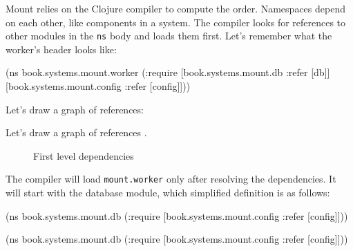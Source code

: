 Mount relies on the Clojure compiler to compute the order. Namespaces depend on each other, like components in a system. The compiler looks for references to other modules in the \verb|ns| body and loads them first. Let's remember what the worker's header looks like:

\begin{english}
  \begin{clojure}
(ns book.systems.mount.worker
  (:require
   [book.systems.mount.db :refer [db]]
   [book.systems.mount.config
     :refer [config]]))
  \end{clojure}
\end{english}


\ifx\MODE\PRINT

\noindent
Let's draw a graph of references:

\begin{figure}[h!]
\end{figure}

\fi

\ifx\MODE\EBOOK

\noindent
Let's draw a graph of references .

\begin{figure}[ht!]
  \caption{First level dependencies}
  \label{fig:chart-sys-2}
\end{figure}

\fi

The compiler will load \verb|mount.worker| only after resolving the dependencies. It will start with the database module, which simplified definition is as follows:

\ifnarrow

\begin{english}
  \begin{clojure}
(ns book.systems.mount.db
  (:require
   [book.systems.mount.config
    :refer [config]]))
  \end{clojure}
\end{english}

\else

\begin{english}
  \begin{clojure}
(ns book.systems.mount.db
  (:require
   [book.systems.mount.config :refer [config]]))
  \end{clojure}
\end{english}

